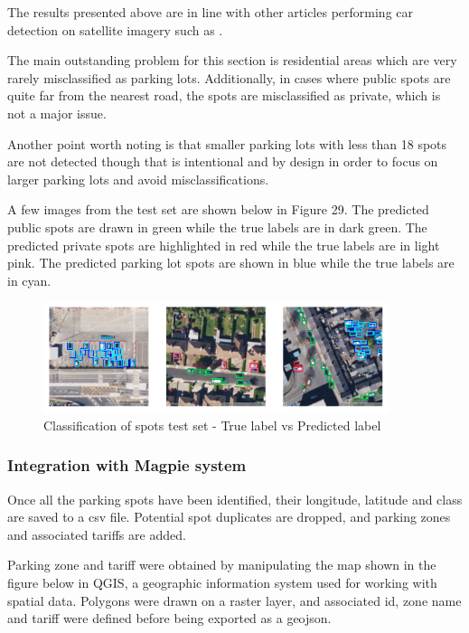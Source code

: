 The results presented above are in line with other articles performing car
detection on satellite imagery such as \cite{similarresults}.

The main outstanding problem for this section is residential areas which are
very rarely misclassified as parking lots. Additionally, in cases where public
spots are quite far from the nearest road, the spots are misclassified as
private, which is not a major issue.

Another point worth noting is that smaller parking lots with less than 18 spots
are not detected though that is intentional and by design in order to focus on
larger parking lots and avoid misclassifications.

A few images from the test set are shown below in Figure 29.
The predicted public spots are drawn in green while the true labels are in dark
green. The predicted private spots are highlighted in red while the true labels
are in light pink. The predicted parking lot spots are shown in blue while the
true labels are in cyan.

\begin{figure}[htbp]
  \centering
  \includegraphics[width=0.9\textwidth]{images/classification-spots-test.png}
  \caption{Classification of spots test set - True label vs Predicted label}
\end{figure}

\newpage{}

\subsubsection{Integration with Magpie system}
Once all the parking spots have been identified, their longitude, latitude and
class are saved to a csv file. Potential spot duplicates are dropped, and
parking zones and associated tariffs are added.

Parking zone and tariff were obtained by manipulating the map shown in the
figure below in QGIS, a geographic information system used for working with
spatial data. Polygons were drawn on a raster layer, and associated id, zone
name and tariff were defined before being exported as a geojson.

